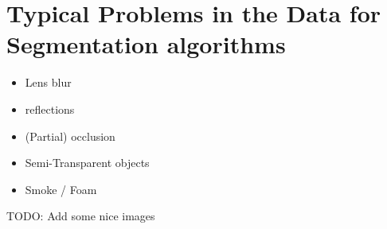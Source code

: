 \section{Typical Problems in the Data for Segmentation algorithms}

\begin{itemize}
    \item Lens blur
    \item reflections
    \item (Partial) occlusion
    \item Semi-Transparent objects
    \item Smoke / Foam
\end{itemize}

TODO: Add some nice images
